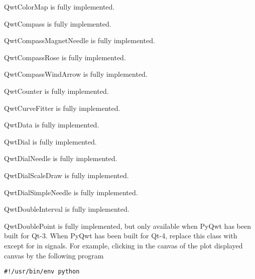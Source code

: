 \documentclass{manual}
\begin{document}
{\begin{classdesc*}{QwtColorMap}
  is fully implemented.
\end{classdesc*}

\begin{classdesc*}{QwtCompass}
  is fully implemented.
\end{classdesc*}

\begin{classdesc*}{QwtCompassMagnetNeedle}
  is fully implemented.
\end{classdesc*}

\begin{classdesc*}{QwtCompassRose}
  is fully implemented.
\end{classdesc*}

\begin{classdesc*}{QwtCompassWindArrow}
  is fully implemented.
\end{classdesc*}

\begin{classdesc*}{QwtCounter}
  is fully implemented.
\end{classdesc*}

\begin{classdesc*}{QwtCurveFitter}
  is fully implemented.
\end{classdesc*}

\begin{classdesc*}{QwtData}
  is fully implemented.
\end{classdesc*}

\begin{classdesc*}{QwtDial}
  is fully implemented.
\end{classdesc*}

\begin{classdesc*}{QwtDialNeedle}
  is fully implemented.
\end{classdesc*}

\begin{classdesc*}{QwtDialScaleDraw}
  is fully implemented.
\end{classdesc*}

\begin{classdesc*}{QwtDialSimpleNeedle}
  is fully implemented.
\end{classdesc*}

\begin{classdesc*}{QwtDoubleInterval}
  is fully implemented.
\end{classdesc*}

\begin{classdesc*}{QwtDoublePoint}
  is fully implemented, but only available when PyQwt has been built for Qt-3.
  When PyQwt has been built for Qt-4, replace this class with 
  except for in signals.
  For example, clicking in the canvas of the plot displayed canvas by the
  following program
  \begin{verbatim}
#!/usr/bin/env python


\end{verbatim}
\end{classdesc*}}
\end{document}
